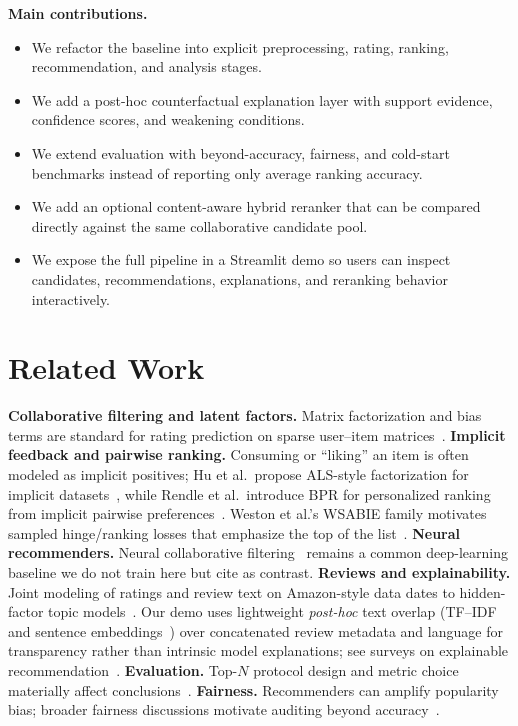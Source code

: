 \documentclass[sigconf,nonacm]{acmart}
\begin{document}
\noindent\textbf{Main contributions.}
\begin{itemize}
  \item We refactor the baseline into explicit preprocessing, rating, ranking, recommendation, and analysis stages.
  \item We add a post-hoc counterfactual explanation layer with support evidence, confidence scores, and weakening conditions.
  \item We extend evaluation with beyond-accuracy, fairness, and cold-start benchmarks instead of reporting only average ranking accuracy.
  \item We add an optional content-aware hybrid reranker that can be compared directly against the same collaborative candidate pool.
  \item We expose the full pipeline in a Streamlit demo so users can inspect candidates, recommendations, explanations, and reranking behavior interactively.
\end{itemize}

\section{Related Work}
\textbf{Collaborative filtering and latent factors.} Matrix factorization and bias terms are standard for rating prediction on sparse user--item matrices~\cite{koren2009matrix,herlocker2004evaluating}. \textbf{Implicit feedback and pairwise ranking.} Consuming or ``liking'' an item is often modeled as implicit positives; Hu et al.\ propose ALS-style factorization for implicit datasets~\cite{hu2008collaborative}, while Rendle et al.\ introduce BPR for personalized ranking from implicit pairwise preferences~\cite{rendle2009bpr}. Weston et al.'s WSABIE family motivates sampled hinge/ranking losses that emphasize the top of the list~\cite{weston2011wsabie}. \textbf{Neural recommenders.} Neural collaborative filtering~\cite{he2017neural} remains a common deep-learning baseline we do not train here but cite as contrast. \textbf{Reviews and explainability.} Joint modeling of ratings and review text on Amazon-style data dates to hidden-factor topic models~\cite{mcauley2013hidden}. Our demo uses lightweight \emph{post-hoc} text overlap (TF--IDF and sentence embeddings~\cite{reimers2019sentence}) over concatenated review metadata and language for transparency rather than intrinsic model explanations; see surveys on explainable recommendation~\cite{zhang2020explainable}. \textbf{Evaluation.} Top-$N$ protocol design and metric choice materially affect conclusions~\cite{cremonesi2010,herlocker2004evaluating}. \textbf{Fairness.} Recommenders can amplify popularity bias; broader fairness discussions motivate auditing beyond accuracy~\cite{burke2017multisided,li2021userfairness}.
\end{document}
